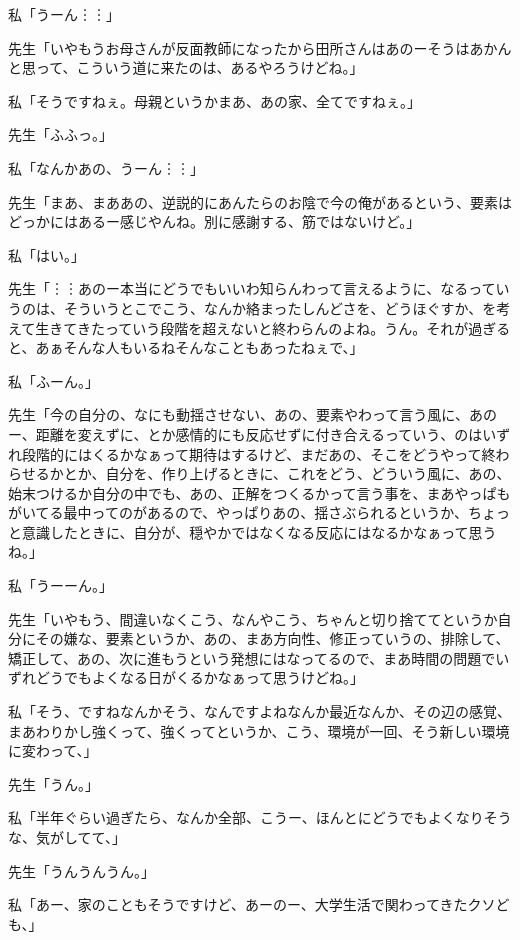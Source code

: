\documentclass[b5j,twoside,twocolumn]{utarticle}
\begin{document}
\begin{description}
\item 私「うーん︙︙」
\item 先生「いやもうお母さんが反面教師になったから田所さんはあのーそうはあかんと思って、こういう道に来たのは、あるやろうけどね。」
\item 私「そうですねぇ。母親というかまあ、あの家、全てですねぇ。」
\item 先生「ふふっ。」
\item 私「なんかあの、うーん︙︙」
\item 先生「まあ、まああの、逆説的にあんたらのお陰で今の俺があるという、要素はどっかにはあるー感じやんね。別に感謝する、筋ではないけど。」
\item 私「はい。」
\item 先生「︙︙あのー本当にどうでもいいわ知らんわって言えるように、なるっていうのは、そういうとこでこう、なんか絡まったしんどさを、どうほぐすか、を考えて生きてきたっていう段階を超えないと終わらんのよね。うん。それが過ぎると、あぁそんな人もいるねそんなこともあったねぇで、」
\item 私「ふーん。」
\item 先生「今の自分の、なにも動揺させない、あの、要素やわって言う風に、あのー、距離を変えずに、とか感情的にも反応せずに付き合えるっていう、のはいずれ段階的にはくるかなぁって期待はするけど、まだあの、そこをどうやって終わらせるかとか、自分を、作り上げるときに、これをどう、どういう風に、あの、始末つけるか自分の中でも、あの、正解をつくるかって言う事を、まあやっぱもがいてる最中ってのがあるので、やっぱりあの、揺さぶられるというか、ちょっと意識したときに、自分が、穏やかではなくなる反応にはなるかなぁって思うね。」
\item 私「うーーん。」
\item 先生「いやもう、間違いなくこう、なんやこう、ちゃんと切り捨ててというか自分にその嫌な、要素というか、あの、まあ方向性、修正っていうの、排除して、矯正して、あの、次に進もうという発想にはなってるので、まあ時間の問題でいずれどうでもよくなる日がくるかなぁって思うけどね。」
\item 私「そう、ですねなんかそう、なんですよねなんか最近なんか、その辺の感覚、まあわりかし強くって、強くってというか、こう、環境が一回、そう新しい環境に変わって、」
\item 先生「うん。」
\item 私「半年ぐらい過ぎたら、なんか全部、こうー、ほんとにどうでもよくなりそうな、気がしてて、」
\item 先生「うんうんうん。」
\item 私「あー、家のこともそうですけど、あーのー、大学生活で関わってきたクソども、」

\end{description}
\end{document}
